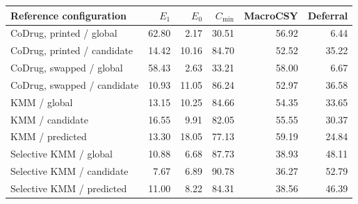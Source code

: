 \begin{tabular}{lrrrrr}\toprule
Reference configuration & $E_1$ & $E_0$ & $C_{\min}$ & MacroCSY & Deferral \\
\midrule
CoDrug, printed / global & 62.80 & 2.17 & 30.51 & 56.92 & 6.44 \\
CoDrug, printed / candidate & 14.42 & 10.16 & 84.70 & 52.52 & 35.22 \\
CoDrug, swapped / global & 58.43 & 2.63 & 33.21 & 58.00 & 6.67 \\
CoDrug, swapped / candidate & 10.93 & 11.05 & 86.24 & 52.97 & 36.58 \\
KMM / global & 13.15 & 10.25 & 84.66 & 54.35 & 33.65 \\
KMM / candidate & 16.55 & 9.91 & 82.05 & 55.55 & 30.37 \\
KMM / predicted & 13.30 & 18.05 & 77.13 & 59.19 & 24.84 \\
Selective KMM / global & 10.88 & 6.68 & 87.73 & 38.93 & 48.11 \\
Selective KMM / candidate & 7.67 & 6.89 & 90.78 & 36.27 & 52.79 \\
Selective KMM / predicted & 11.00 & 8.22 & 84.31 & 38.56 & 46.39 \\
\bottomrule\end{tabular}

